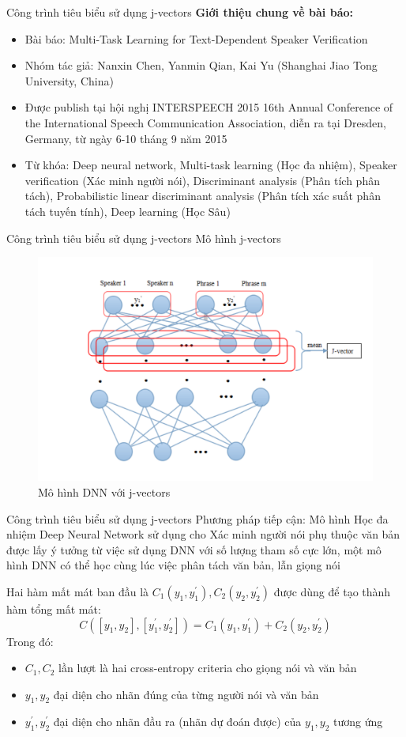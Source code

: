 \documentclass[notheorems, aspectratio=54]{beamer}
\begin{document}
\begin{frame}{Công trình tiêu biểu sử dụng j-vectors}
	\textbf{Giới thiệu chung về bài báo:}
	\begin{itemize}
		\item Bài báo: Multi-Task Learning for Text-Dependent Speaker Verification
		\item Nhóm tác giả: Nanxin Chen, Yanmin Qian, Kai Yu (Shanghai Jiao Tong University, China)
		\item Được publish tại hội nghị INTERSPEECH 2015 16th Annual Conference of the International Speech Communication Association, diễn ra tại Dresden, Germany, từ ngày 6-10 tháng 9 năm 2015
		\item Từ khóa: Deep neural network, Multi-task learning (Học đa nhiệm), Speaker verification (Xác minh người nói), Discriminant analysis (Phân tích phân tách), Probabilistic linear discriminant analysis (Phân tích xác suất phân tách tuyến tính), Deep learning (Học Sâu)
	\end{itemize}
\end{frame}
\begin{frame}{Công trình tiêu biểu sử dụng j-vectors}
	Mô hình j-vectors
	\begin{figure}[H]
		\includegraphics[width=0.7\linewidth]{images/j-vectors.png}
		\caption{Mô hình DNN với j-vectors}
		\label{fig:writing-thesis}
	\end{figure}
\end{frame}
\begin{frame}{Công trình tiêu biểu sử dụng j-vectors}
	Phương pháp tiếp cận: Mô hình Học đa nhiệm Deep Neural Network sử dụng cho Xác minh người nói phụ thuộc văn bản được lấy ý tưởng từ việc sử dụng DNN với số lượng tham số cực lớn, một mô hình DNN có thể học cùng lúc việc phân tách văn bản, lẫn giọng nói
	
	Hai hàm mất mát ban đầu là $C_1(y_1, y_1^{'}), C_2(y_2, y_2^{'})$ được dùng để tạo thành hàm tổng mất mát:
	$$C([y_1, y_2], [y_1^{'}, y_2^{'}]) = C_1(y_1, y_1^{'}) + C_2(y_2, y_2^{'})$$
	Trong đó:
	\begin{itemize}
		\item $C_1, C_2$ lần lượt là hai cross-entropy criteria cho giọng nói và văn bản
		\item $y_1, y_2$ đại diện cho nhãn đúng của từng người nói và văn bản
		\item $y_1^{'}, y_2^{'}$ đại diện cho nhãn đầu ra (nhãn dự đoán được) của $y_1, y_2$ tương ứng
	\end{itemize}
\end{frame}
\end{document}
